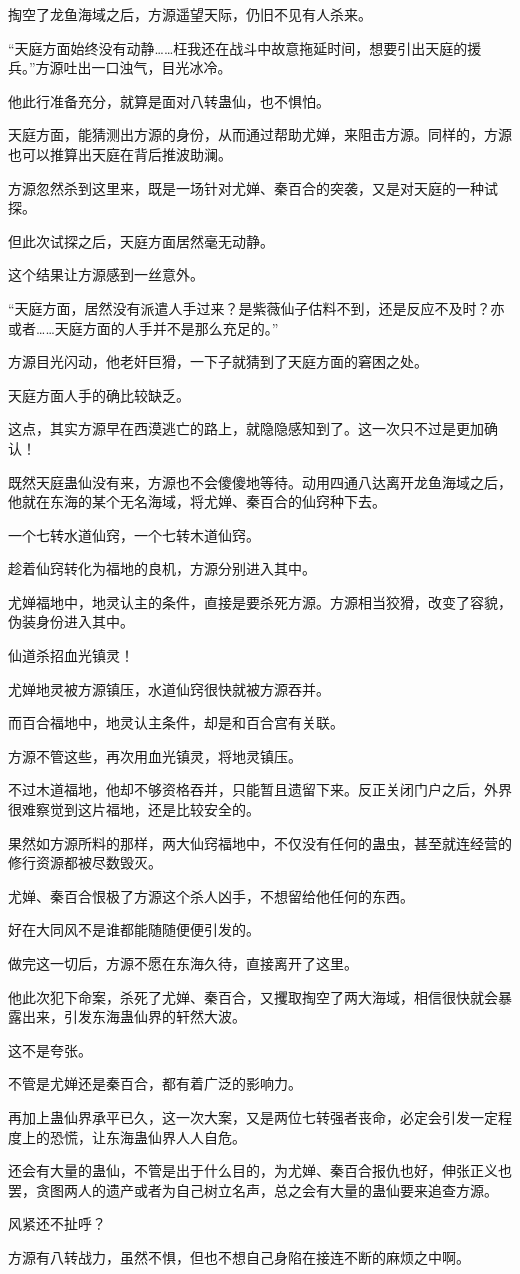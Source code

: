 \begin{this_body}
掏空了龙鱼海域之后，方源遥望天际，仍旧不见有人杀来。

“天庭方面始终没有动静……枉我还在战斗中故意拖延时间，想要引出天庭的援兵。”方源吐出一口浊气，目光冰冷。

他此行准备充分，就算是面对八转蛊仙，也不惧怕。

天庭方面，能猜测出方源的身份，从而通过帮助尤婵，来阻击方源。同样的，方源也可以推算出天庭在背后推波助澜。

方源忽然杀到这里来，既是一场针对尤婵、秦百合的突袭，又是对天庭的一种试探。

但此次试探之后，天庭方面居然毫无动静。

这个结果让方源感到一丝意外。

“天庭方面，居然没有派遣人手过来？是紫薇仙子估料不到，还是反应不及时？亦或者……天庭方面的人手并不是那么充足的。”

方源目光闪动，他老奸巨猾，一下子就猜到了天庭方面的窘困之处。

天庭方面人手的确比较缺乏。

这点，其实方源早在西漠逃亡的路上，就隐隐感知到了。这一次只不过是更加确认！

既然天庭蛊仙没有来，方源也不会傻傻地等待。动用四通八达离开龙鱼海域之后，他就在东海的某个无名海域，将尤婵、秦百合的仙窍种下去。

一个七转水道仙窍，一个七转木道仙窍。

趁着仙窍转化为福地的良机，方源分别进入其中。

尤婵福地中，地灵认主的条件，直接是要杀死方源。方源相当狡猾，改变了容貌，伪装身份进入其中。

仙道杀招血光镇灵！

尤婵地灵被方源镇压，水道仙窍很快就被方源吞并。

而百合福地中，地灵认主条件，却是和百合宫有关联。

方源不管这些，再次用血光镇灵，将地灵镇压。

不过木道福地，他却不够资格吞并，只能暂且遗留下来。反正关闭门户之后，外界很难察觉到这片福地，还是比较安全的。

果然如方源所料的那样，两大仙窍福地中，不仅没有任何的蛊虫，甚至就连经营的修行资源都被尽数毁灭。

尤婵、秦百合恨极了方源这个杀人凶手，不想留给他任何的东西。

好在大同风不是谁都能随随便便引发的。

做完这一切后，方源不愿在东海久待，直接离开了这里。

他此次犯下命案，杀死了尤婵、秦百合，又攫取掏空了两大海域，相信很快就会暴露出来，引发东海蛊仙界的轩然大波。

这不是夸张。

不管是尤婵还是秦百合，都有着广泛的影响力。

再加上蛊仙界承平已久，这一次大案，又是两位七转强者丧命，必定会引发一定程度上的恐慌，让东海蛊仙界人人自危。

还会有大量的蛊仙，不管是出于什么目的，为尤婵、秦百合报仇也好，伸张正义也罢，贪图两人的遗产或者为自己树立名声，总之会有大量的蛊仙要来追查方源。

风紧还不扯呼？

方源有八转战力，虽然不惧，但也不想自己身陷在接连不断的麻烦之中啊。

\end{this_body}

